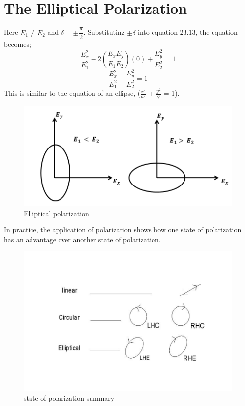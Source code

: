 \section{The Elliptical Polarization}
Here $E_1\neq E_2$ and $\delta = \pm \dfrac{\pi}{2} $. Substituting $\pm \delta$ into equation 23.13, the equation becomes;
\begin{equation}
\frac{E_{x}^2}{E_{1}^2} -2(\frac{E_{x}E_{y}}{E_{1}E_{2}})(0) + \frac{E_{y}^2}{E_{2}^2} = 1
\end{equation}
\begin{equation}
\frac{E_{x}^2}{E_{1}^2} + \frac{E_{y}^2}{E_{2}^2} = 1
\end{equation}
This is similar to the equation of an ellipse, ($\frac{x^2}{a^2}$ + $\frac{y^2}{b^2}$ = 1).
\begin{figure}[h]
\centering
\includegraphics[width=1\linewidth]{graphics/elliptical_polarization2}
\caption{Elliptical polarization}
\end{figure}

In practice, the application of polarization shows how one state of polarization has an advantage over another state of polarization.
\begin{figure}[h]
\centering
\includegraphics[width=1\linewidth]{graphics/eee}
\caption{state of polarization summary}
\end{figure}

